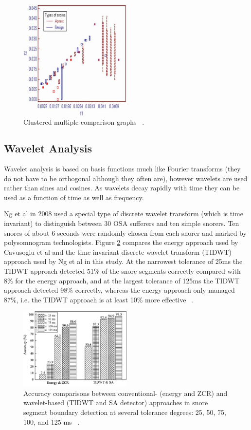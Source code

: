 \begin{figure}[h]
\centering 
\includegraphics[width=0.5\textwidth]{drawings/ng2007fig6}
\caption{Clustered multiple comparison graphs ~\cite{ng2007bispectral}.}
\label{fig:ng2007fig6 }
\end{figure}

\subsection{Wavelet Analysis}
Wavelet analysis is based on basis functions much like Fourier transforms (they do not have to be orthogonal although they often are), however wavelets are used rather than sines and cosines. As wavelets decay rapidly with time they can be used as a function of time as well as frequency.

Ng et al in 2008 used a special type of discrete wavelet transform (which is time invariant) to distinguish between 30 OSA sufferers and ten simple snorers. Ten snores of about 6 seconds were randomly chosen from each snorer and marked by polysomnogram technologists. Figure \ref{fig:ng2008bfig5} compares the energy approach used by Cavusoglu et al and the time invariant discrete wavelet transform (TIDWT) approach used by Ng et al in this study. At the narrowest tolerance of 25ms the TIDWT approach detected 51\% of the snore segments correctly compared with 8\% for the energy approach, and at the largest tolerance of 125ms the TIDWT approach detected 98\% correctly, whereas the energy approach only managed 87\%, i.e. the TIDWT approach is at least 10\% more effective ~\cite{ng2008snore}.


\begin{figure}[h]
\centering 
\includegraphics[width=0.5\textwidth]{drawings/ng2008bfig5}
\caption{Accuracy comparisons between conventional- (energy and ZCR) and wavelet-based (TIDWT and SA detector) approaches in snore segment boundary detection at several tolerance degrees: 25, 50, 75, 100, and 125 ms ~\cite{ng2008snore}.}
\label{fig:ng2008bfig5}
\end{figure}

